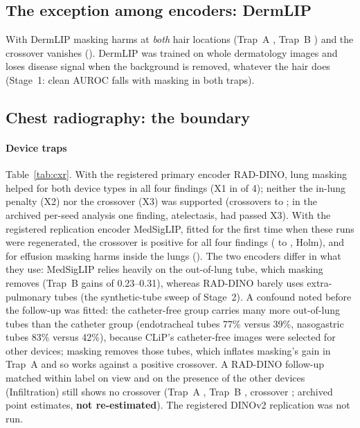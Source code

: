\subsection{The exception among encoders: DermLIP}
With DermLIP masking harms at \emph{both} hair locations (Trap~A \sThreeAisicDermLIP, Trap~B \sThreeBisicDermLIP) and the
crossover vanishes (\sThreeXisicDermLIP). DermLIP was trained on whole dermatology images and loses disease signal when
the background is removed, whatever the hair does (Stage~1: clean AUROC falls with masking in both traps).

\subsection{Chest radiography: the boundary}
\paragraph{Device traps} Table~\ref{tab:cxr}. With the registered primary encoder RAD-DINO, lung masking helped for both
device types in all four findings (X1 in \sThreeCxrXOneRADDINO{} of 4); neither the in-lung penalty (X2) nor the
crossover (X3) was supported (crossovers \sThreeCxrXminRADDINO{} to \sThreeCxrXmaxRADDINO; in the archived per-seed
analysis one finding, atelectasis, had passed X3). With the registered replication encoder MedSigLIP, fitted for the
first time when these runs were regenerated, the crossover is positive for all four findings (\sThreeCxrXminMedSigLIP{}
to \sThreeCxrXmaxMedSigLIP, Holm), and for effusion masking harms inside the lungs (\sThreeCxrMedSigLIPEffA). The two
encoders differ in what they use: MedSigLIP relies heavily on the out-of-lung tube, which masking removes (Trap~B gains
of 0.23--0.31), whereas RAD-DINO barely uses extra-pulmonary tubes (the synthetic-tube sweep of Stage~2). A confound noted
before the follow-up was fitted: the catheter-free group carries many more out-of-lung tubes than the catheter group
(endotracheal tubes 77\% versus 39\%, nasogastric tubes 83\% versus 42\%), because CLiP's catheter-free images were
selected for other devices; masking removes those tubes, which inflates masking's gain in Trap~A and so works against a
positive crossover. A RAD-DINO follow-up matched within label on view and on the presence of the other devices
(Infiltration) still shows no crossover (Trap~A \sThreeDmtrapA, Trap~B \sThreeDmtrapB, crossover \sThreeDmcrossover;
archived point estimates, \textbf{not re-estimated}). The registered DINOv2 replication was not run.

